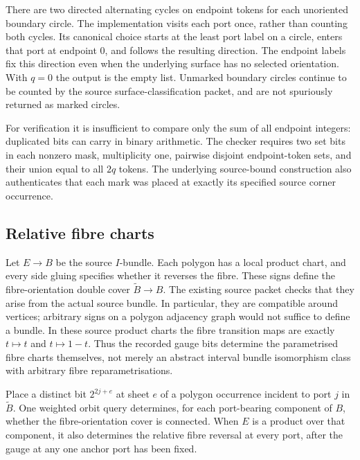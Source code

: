 There are two directed alternating cycles on endpoint tokens for each
unoriented boundary circle.  The implementation visits each port once, rather
than counting both cycles.  Its canonical choice starts at the least port
label on a circle, enters that port at endpoint $0$, and follows the resulting
direction.  The endpoint labels fix this direction even when the underlying
surface has no selected orientation.  With $q=0$ the output is the empty
list.  Unmarked boundary circles continue to be counted by the source
surface-classification packet, and are not spuriously returned as marked
circles.

For verification it is insufficient to compare only the sum of all endpoint
integers: duplicated bits can carry in binary arithmetic.  The checker
requires two set bits in each nonzero mask, multiplicity one, pairwise
disjoint endpoint-token sets, and their union equal to all $2q$ tokens.
The underlying source-bound construction also authenticates that each mark
was placed at exactly its specified source corner occurrence.

\subsection{Relative fibre charts}

Let $E\to B$ be the source $I$-bundle.  Each polygon has a local product
chart, and every side gluing specifies whether it reverses the fibre.
These signs define the fibre-orientation double cover $\widetilde B\to B$.
The existing source packet checks that they arise from the actual source
bundle.  In particular, they are compatible around vertices; arbitrary
signs on a polygon adjacency graph would not suffice to define a bundle.
In these source product charts the fibre transition maps are exactly
$t\mapsto t$ and $t\mapsto1-t$.  Thus the recorded gauge bits determine
the parametrised fibre charts themselves, not merely an abstract interval
bundle isomorphism class with arbitrary fibre reparametrisations.

\begin{theorem}
\label{thm:marked-fibre-gauges}
Place a distinct bit $2^{2j+e}$ at sheet $e$ of a polygon occurrence incident
to port $j$ in $\widetilde B$.  One weighted orbit query determines, for
each port-bearing component of $B$, whether the fibre-orientation cover is
connected.  When $E$ is a product over that component, it also determines
the relative fibre reversal at every port, after the gauge at any one
anchor port has been fixed.
\end{theorem}

